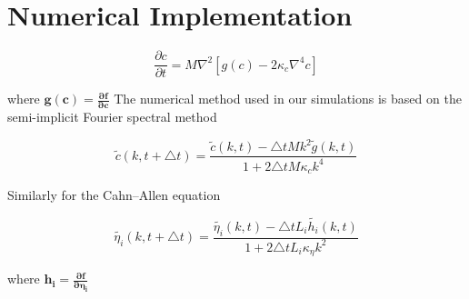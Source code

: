\section{Numerical Implementation}

\begin{equation}
\frac{\partial c}{\partial t}=M\nabla^2\left[g(c)-2\kappa_c\nabla^4 c\right]
\end{equation}

where $\mathbold{g(c)=\frac{\partial f}{\partial c}}$
The numerical method used in our simulations is based on the semi-implicit Fourier spectral method

\begin{equation}
\tilde{c}(k,t+\triangle t)=\frac{\tilde{c}(k,t)-\triangle t M k^2 \tilde{g}(k,t)}{1+2\triangle t M \kappa_c k^4}
\end{equation}

Similarly for the Cahn–Allen equation

\begin{equation}
\tilde{\eta_i}(k,t+\triangle t)=\frac{\tilde{\eta_i}(k,t)-\triangle t L_i \tilde{h_i}(k,t)}{1+2\triangle t L_i \kappa_\eta k^2}
\end{equation}

where $\mathbold{h_i=\frac{\partial f}{\partial \eta_i}}$

